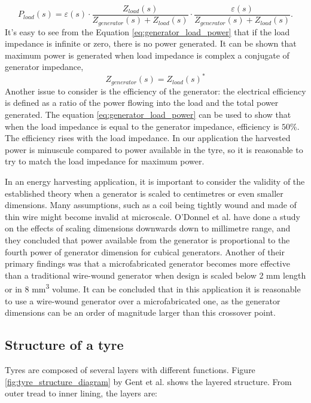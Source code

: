 \begin{equation} \label{eq:generator_load_power}
  P_{load}(s) = \varepsilon(s)  \cdot  \frac{Z_{load}(s)}{Z_{generator}(s)+Z_{load}(s)}  \cdot  \frac{\varepsilon(s)}{Z_{generator}(s)+Z_{load}(s)}.
\end{equation}
It's easy to see from the Equation \eqref{eq:generator_load_power} that if the load impedance is infinite or zero, there is no power generated. It can be shown that maximum power is generated when load impedance is complex a conjugate of generator impedance, 
\begin{equation} \label{eq:matched_load}
Z_{generator}(s) = {Z_{load}(s)}^*\end{equation}
Another issue to consider is the efficiency of the generator: the electrical efficiency is defined as a ratio of the power flowing into the load and the total power generated. The equation \eqref{eq:generator_load_power} can be used to show that when the load impedance is equal to the generator impedance, efficiency is $ 50 \%$. The efficiency rises with the load impedance. In our application the harvested power is minuscule compared to power available in the tyre, so it is reasonable to try to match the load impedance for maximum power.

In an energy harvesting application, it is important to consider the validity of the established theory when a generator is scaled to centimetres or even smaller dimensions. Many assumptions, such as a coil being tightly wound and made of thin wire might become invalid at microscale. O'Donnel et al. \cite{ODonnell2007} have done a study on the effects of scaling dimensions downwards down to millimetre range, and they concluded that power available from the generator is proportional to the fourth power of generator dimension for cubical generators. Another of their primary findings was that a microfabricated generator becomes more effective than a traditional wire-wound generator when design is scaled below 2 mm length or in 8 mm\textsuperscript{3} volume. It can be concluded that in this application it is reasonable to use a wire-wound generator over a microfabricated one, as the generator dimensions can be an order of magnitude larger than this crossover point. 


\subsection{Structure of a tyre}

Tyres are composed of several layers with different functions. Figure \ref{fig:tyre_structure_diagram} by Gent et al. \cite{Gent2005} shows the layered structure. From outer tread to inner lining, the layers are: 

